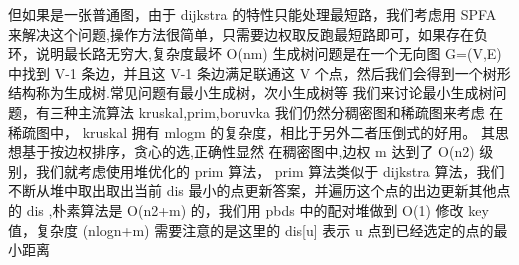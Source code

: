 {}但如果是一张普通图，由于\markdownRendererDollarSign{} dijkstra \markdownRendererDollarSign{}的特性只能处理最短路，我们考虑用\markdownRendererDollarSign{} SPFA\markdownRendererSoftLineBreak
{}\markdownRendererDollarSign{}来解决这个问题,操作方法很简单，只需要边权取反跑最短路即可，如果存在负环，说明最长路无穷大,复杂度最坏\markdownRendererDollarSign{} O(nm) \markdownRendererDollarSign{}\markdownRendererInterblockSeparator
{}
\markdownRendererSectionEnd 
\markdownRendererSectionEnd \markdownRendererSectionBegin
{}\markdownRendererInterblockSeparator
{}生成树问题是在一个无向图\markdownRendererDollarSign{} G=(V,E) \markdownRendererDollarSign{}中找到\markdownRendererDollarSign{} V-1 \markdownRendererDollarSign{}条边，并且这\markdownRendererDollarSign{} V-1 \markdownRendererDollarSign{}条边满足联通这\markdownRendererDollarSign{} V \markdownRendererDollarSign{}个点，然后我们会得到一个树形结构称为生成树.常见问题有最小生成树，次小生成树等\markdownRendererInterblockSeparator
{}\markdownRendererSectionBegin
{}\markdownRendererInterblockSeparator
{}我们来讨论最小生成树问题，有三种主流算法\markdownRendererDollarSign{} kruskal,prim,boruvka\markdownRendererSoftLineBreak
{}\markdownRendererDollarSign{}\markdownRendererParagraphSeparator
{}我们仍然分稠密图和稀疏图来考虑\markdownRendererParagraphSeparator
{}在稀疏图中，\markdownRendererDollarSign{} kruskal \markdownRendererDollarSign{}拥有\markdownRendererDollarSign{} mlogm \markdownRendererDollarSign{}的复杂度，相比于另外二者压倒式的好用。\markdownRendererParagraphSeparator
{}其思想基于按边权排序，贪心的选,正确性显然\markdownRendererInterblockSeparator
{}\markdownRendererSectionBegin
{}\markdownRendererInterblockSeparator
{}\markdownRendererInterblockSeparator
{}在稠密图中,边权\markdownRendererDollarSign{} m\markdownRendererSoftLineBreak
{}\markdownRendererDollarSign{}达到了\markdownRendererDollarSign{} O(n\markdownRendererCircumflex{}2) \markdownRendererDollarSign{}级别，我们就考虑使用堆优化的\markdownRendererDollarSign{} prim \markdownRendererDollarSign{}算法，\markdownRendererDollarSign{} prim \markdownRendererDollarSign{}算法类似于\markdownRendererDollarSign{} dijkstra \markdownRendererDollarSign{}算法，我们不断从堆中取出取出当前\markdownRendererDollarSign{} dis \markdownRendererDollarSign{}最小的点更新答案，并遍历这个点的出边更新其他点的\markdownRendererDollarSign{} dis \markdownRendererDollarSign{},朴素算法是\markdownRendererDollarSign{} O(n\markdownRendererCircumflex{}2+m) \markdownRendererDollarSign{}的，我们用\markdownRendererDollarSign{} pbds \markdownRendererDollarSign{}中的配对堆做到\markdownRendererDollarSign{} O(1) \markdownRendererDollarSign{}修改\markdownRendererDollarSign{} key \markdownRendererDollarSign{}值，复杂度\markdownRendererDollarSign{} (nlogn+m) \markdownRendererDollarSign{} 需要注意的是这里的\markdownRendererDollarSign{} dis[u] \markdownRendererDollarSign{}表示\markdownRendererDollarSign{} u \markdownRendererDollarSign{}点到已经选定的点的最小距离\markdownRendererParagraphSeparator
